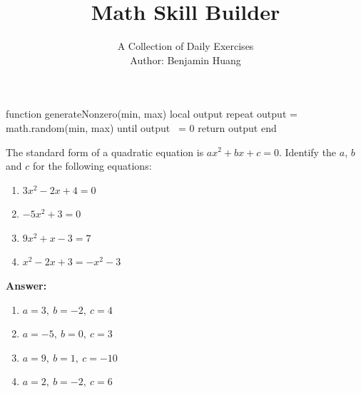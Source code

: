 \documentclass[10pt]{beamer}
\author[B.H.]{{\Large A Collection of Daily Exercises}\\\vspace{.5em} Author: Benjamin Huang}
\date{}
\title[Skill Builder]{Math Skill Builder}
\begin{document}
\begin{luacode*}
function generateNonzero(min, max)
  local output
  repeat
    output = math.random(min, max)
  until output ~= 0
  return output
end
\end{luacode*}
\frame{\titlepage}
\begin{frame}
The standard form of a quadratic equation is $ax^2 + bx + c = 0$.
Identify the $a$, $b$ and $c$ for the following equations:
\begin{enumerate}[label=(\arabic*)]
\item $3x^2 - 2x + 4 = 0$
\item $-5x^2 +3 = 0$
\item $9x^2 +x -3 = 7$
\item $x^2 -2x + 3 = -x^2 -3$
\end{enumerate}
\pause

\color{red}
{\bf Answer:}
\begin{enumerate}[label=(\arabic*)]
\item
$a = 3,\ b =-2,\ c = 4$
\item
$a=-5,\ b = 0,\ c=3$
\item
$a=9,\ b=1,\ c=-10$
\item
$a=2,\ b=-2,\ c=6$
\end{enumerate}
\end{frame}
\end{document}

